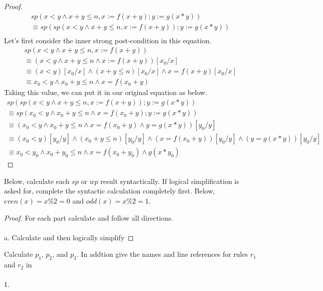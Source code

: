 \documentclass[12pt]{article}
\newenvironment{exercise}[2][Exercise]{\begin{trivlist}
\item[\hskip \labelsep {\bfseries #1}\hskip \labelsep {\bfseries #2.}]}{\end{trivlist}}
\begin{document}
\begin{proof}
\begin{gather*}
    sp(x < y \land x +y \leq n, x := f(x+y); y := g(x*y)) \\ 
    \equiv sp(sp(x < y \land x + y \leq n, x := f(x+y)); y := g(x*y)) \\ 
\end{gather*}
Let's first consider the inner strong post-condition in this equation.
\begin{gather*}
    sp(x < y \land x + y \leq n, x := f(x+y)) \\
    \equiv (x < y \land x + y \leq n \land x := f(x +y))[x_{0}/x] \\ 
    \equiv (x < y)[x_{0}/x] \land (x+y \leq n)[x_{0}/x] \land x = f(x+y)[x_{0}/x] \\ 
    \equiv x_{0} < y \land x_{0} + y \leq n \land x = f(x_{0} + y) 
\end{gather*}
Taking this value, we can put it in our original equation as below. 
\begin{gather*}
    sp(sp(x < y \land x + y \leq n, x := f(x+y)); y := g(x*y)) \\ 
    \equiv sp(x_{0} < y \land x_{0} + y \leq n \land x = f(x_{0} + y); y := g(x*y)) \\
    \equiv (x_{0} < y \land x_{0} + y \leq n \land x = f(x_{0} + y) \land y = g(x*y))[y_{0}/y] \\ 
    \equiv (x_{0} < y)[y_{0}/y] \land (x_{0} + y \leq n)[y_{0}/y] \land (x = f(x_{0} + y))[y_{0}/y] \land (y = g(x*y))[y_{0}/y] \\ 
    \equiv x_{0} < y_{0} \land x_{0} + y_{0} \leq n \land x = f(x_{0} + y_{0}) \land g(x * y_{0})
\end{gather*}
\end{proof}

\begin{exercise}{3}
Below, calculate each $sp$ or $wp$ result syntactically. If logical simplification is asked for, complete the syntactic calculation completely first. Below, $even(x) = x\%2 = 0$ and $odd(x) = x\%2 = 1$. 
\end{exercise}

\begin{proof}
For each part calculate and follow all directions. \\ \\ 
a. Calculate and then logically simplify
\end{proof}


\begin{exercise}{4}
Calculate $p_{1}$, $p_{2}$, and $p_{3}$. In addtion give the names and line references for rules $r_{1}$ and $r_{2}$ in \\ \\ 
1. 
\end{exercise}
\end{document}
